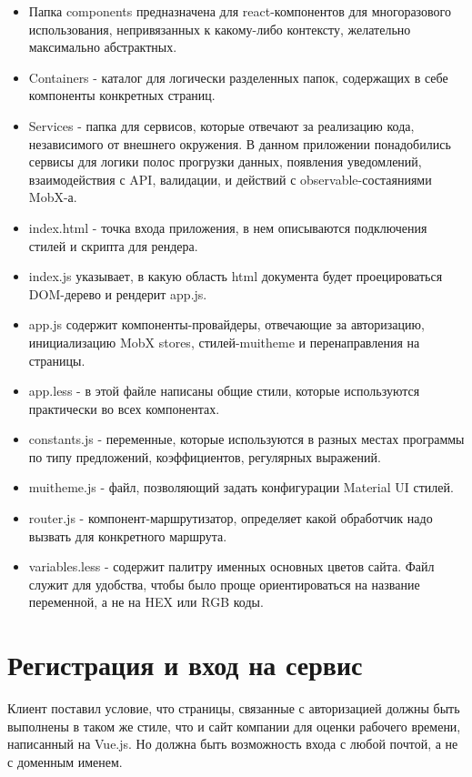 \documentclass[a4paper,12pt]{diplom}
\begin{document}
\begin{itemize}
  \item Папка components предназначена для react-компонентов для многоразового использования, непривязанных к какому-либо контексту, желательно максимально абстрактных.
  \item Containers - каталог для логически разделенных папок, содержащих в себе компоненты конкретных страниц.
  \item Services - папка для сервисов, которые отвечают за реализацию кода, независимого от внешнего окружения. В данном приложении понадобились сервисы для логики полос прогрузки данных, появления уведомлений, взаимодействия с API, валидации, и действий с observable-состаяниями MobX-а.
  \item index.html - точка входа приложения, в нем описываются подключения стилей и скрипта для рендера.
  \item index.js указывает, в какую область html документа будет проецироваться DOM-дерево и рендерит app.js.
  \item app.js содержит компоненты-провайдеры, отвечающие за авторизацию, инициализацию MobX stores, стилей-muitheme и перенаправления на страницы.
  \item app.less - в этой файле написаны общие стили, которые используются практически во всех компонентах.
  \item constants.js - переменные, которые используются в разных местах программы по типу предложений, коэффициентов, регулярных выражений.
  \item muitheme.js - файл, позволяющий задать конфигурации Material UI стилей.
  \item router.js - компонент-маршрутизатор, определяет какой обработчик надо вызвать для конкретного маршрута.
  \item variables.less - содержит палитру именных основных цветов сайта. Файл служит для удобства, чтобы было проще ориентироваться на название переменной, а не на HEX или RGB коды.
\end{itemize}

\section{Регистрация и вход на сервис}

Клиент поставил условие, что страницы, связанные с авторизацией должны быть выполнены в таком же стиле, что и сайт компании для
оценки рабочего времени, написанный на Vue.js. Но должна быть возможность входа с любой почтой, а не с доменным именем.
\end{document}
